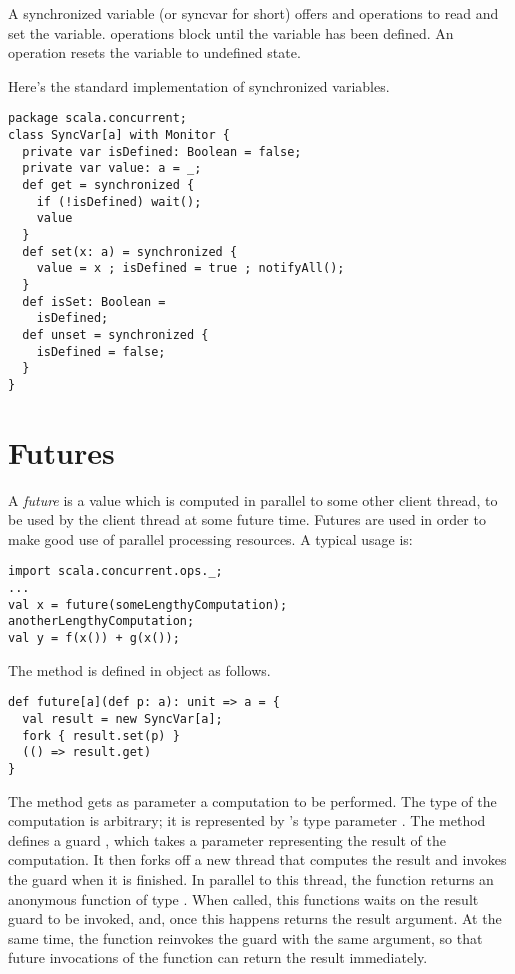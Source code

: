\documentclass[a4paper,12pt,twoside,titlepage]{book}
\begin{document}
{A synchronized variable (or syncvar for short) offers  and
 operations to read and set the variable.  operations
block until the variable has been defined. An  operation
resets the variable to undefined state.

Here's the standard implementation of synchronized variables.
\begin{lstlisting}
package scala.concurrent;
class SyncVar[a] with Monitor {
  private var isDefined: Boolean = false;
  private var value: a = _;
  def get = synchronized {
    if (!isDefined) wait();
    value
  }
  def set(x: a) = synchronized {
    value = x ; isDefined = true ; notifyAll();
  }
  def isSet: Boolean = 
    isDefined;
  def unset = synchronized { 
    isDefined = false; 
  }
}
\end{lstlisting}

\section{Futures}
\label{sec:futures}

A {\em future} is a value which is computed in parallel to some other
client thread, to be used by the client thread at some future time.
Futures are used in order to make good use of parallel processing
resources.  A typical usage is:

\begin{lstlisting}
import scala.concurrent.ops._;
...
val x = future(someLengthyComputation);
anotherLengthyComputation;
val y = f(x()) + g(x());
\end{lstlisting}

The  method is defined in object
 as follows.
\begin{lstlisting}
def future[a](def p: a): unit => a = {
  val result = new SyncVar[a];
  fork { result.set(p) }
  (() => result.get)
}
\end{lstlisting}

The  method gets as parameter a computation  to
be performed. The type of the computation is arbitrary; it is
represented by 's type parameter .  The
 method defines a guard , which takes a
parameter representing the result of the computation. It then forks
off a new thread that computes the result and invokes the
 guard when it is finished. In parallel to this thread,
the function returns an anonymous function of type .
When called, this functions waits on the result guard to be
invoked, and, once this happens returns the result argument.
At the same time, the function reinvokes the  guard with
the same argument, so that future invocations of the function can
return the result immediately.

}
\end{document}
